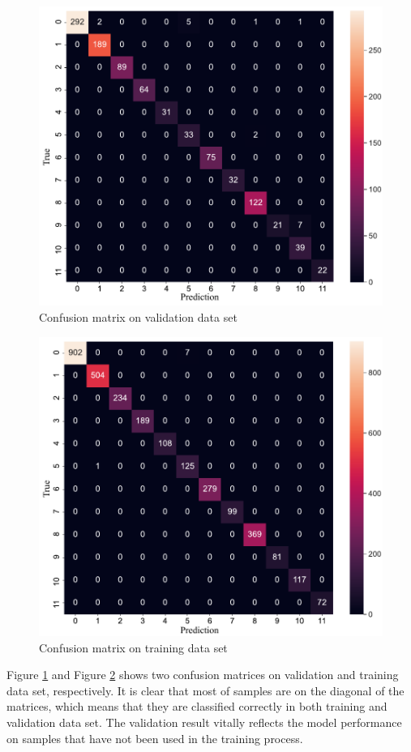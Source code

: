 \clearpage
\begin{figure}[H]
    \centering
    \includegraphics[width=.75\textwidth]{evaluation/imgs/5-confusion_matrix_val.pdf}
    \caption{Confusion matrix on validation data set}
    \label{fig:5-confusion_matrix_val}
\end{figure}
\begin{figure}[H]
    \centering
    \includegraphics[width=.75\textwidth]{evaluation/imgs/5-confusion_matrix_train.pdf}
    \caption{Confusion matrix on training data set}
    \label{fig:5-confusion_matrix_train}
\end{figure}

Figure \ref{fig:5-confusion_matrix_val} and Figure \ref{fig:5-confusion_matrix_train} shows two confusion matrices on validation and training data set, respectively.
It is clear that most of samples are on the diagonal of the matrices, which means that they are classified correctly in both training and validation data set.
The validation result vitally reflects the model performance on samples that have not been used in the training process.

